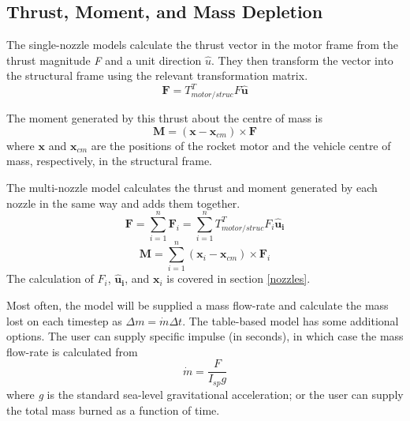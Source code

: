 \documentclass[11pt,fleqn]{report}
\begin{document}
\subsection{Thrust, Moment, and Mass Depletion}
\par The single-nozzle models calculate the thrust vector in the motor frame from the thrust magnitude \textit{F} and a unit direction $\hat{u}$. They then transform the vector into the structural frame using the relevant transformation matrix.
$$\mathbf{F} = T_{motor/struc}^T F\mathbf{\hat{u}}$$
\par The moment generated by this thrust about the centre of mass is
$$\mathbf{M} = (\mathbf{x} - \mathbf{x}_{cm}) \times \mathbf{F}$$
where $\mathbf{x}$ and $\mathbf{x}_{cm}$ are the positions of the rocket motor and the vehicle centre of mass, respectively, in the structural frame.
\par The multi-nozzle model calculates the thrust and moment generated by each nozzle in the same way and adds them together.
$$\mathbf{F} = \sum\limits_{i=1}^n \mathbf{F}_i = \sum\limits_{i=1}^n T_{motor/struc}^T F_i \mathbf{\hat{u}_i}$$
$$\mathbf{M} = \sum\limits_{i=1}^n (\mathbf{x}_i - \mathbf{x}_{cm}) \times \mathbf{F}_i$$
The calculation of $F_i$, $\mathbf{\hat{u}_i}$, and $\mathbf{x}_i$ is covered in section \ref{nozzles}.
\par Most often, the model will be supplied a mass flow-rate and calculate the mass lost on each timestep as $\Delta m = \dot{m} \Delta t$. The table-based model has some additional options. The user can supply specific impulse (in seconds), in which case the mass flow-rate is calculated from $$\dot{m} = \frac{F}{I_{sp} g}$$ where \textit{g} is the standard sea-level gravitational acceleration; or the user can supply the total mass burned as a function of time.
\end{document}
